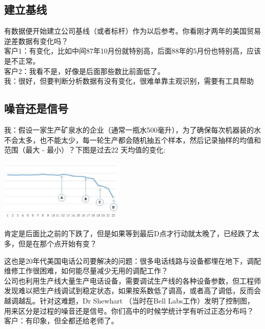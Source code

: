 \hypertarget{ux5efaux7acbux57faux7ebf}{%
\subsection{建立基线}\label{ux5efaux7acbux57faux7ebf}}

有数据便开始建立公司基线（或者标杆）作为以后参考。你看刚才两年的美国贸易逆差数据有变化吗？\\
客户1：有变化，比如中间87年10月份就特别高，后面88年的5月份也特别高，应该是不正常。\\
客户2：我看不是，好像是后面那些数比前面低了。\\
我：很好，但要判断分析数据有没有变化，很难单靠主观识别，需要有工具帮助

\hypertarget{ux566aux97f3ux8fd8ux662fux4fe1ux53f7}{%
\subsection{噪音还是信号}\label{ux566aux97f3ux8fd8ux662fux4fe1ux53f7}}

我：假设一家生产矿泉水的企业（通常一瓶水500毫升），为了确保每次机器装的水不会太多，也不能太少，每一轮生产都会随机抽五个样本，然后记录抽样的均值和范围（最大
- 最小）？下图是过去22 天均值的变化:


\includegraphics[width=6cm]{DistillWaterCC.jpg}

肯定是后面比之前的下跌了，但是如果等到最后D点才行动就太晚了，已经跌了太多，但是在那个点开始有变？

这也是20年代美国电话公司要解决的问题：很多电话线路与设备都埋在地下，调配维修工作很困难，如何能尽量减少无用的调配工作？\\
公司也利用生产线大量生产电话设备，需要调试生产线的各种设备参数，但工程师发现难以把生产线调试到稳定状态，如果按系数低了调高，或者高了调低，反而会越调越乱。针对这难题，Dr
Shewhart （当时在Bell
Labs工作）发明了控制图，用来区分是过程的噪音还是信号。你们高中的时候学统计学有听过正态分布吗？\\
客户：有印象，但全都还给老师了。\\

